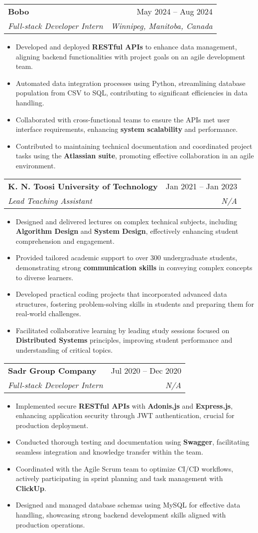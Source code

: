 \documentclass[letterpaper,11pt]{article}
\makeatletter
\newcommand{\resumeItem}[1]{
  \item\small{
    #1 \vspace{0pt}
  }
}
\newcommand{\resumeSubheading}[4]{
  \vspace{-2pt}\item
    \begin{tabular*}{0.97\textwidth}[t]{l@{\extracolsep{\fill}}r}
      \textbf{#1} & #2 \\
      \textit{\small#3} & \textit{\small #4} \\
    \end{tabular*}\vspace{-3pt}
}
\newcommand{\resumeItemListStart}{\begin{itemize}}
\newcommand{\resumeItemListEnd}{\end{itemize}\vspace{-5pt}}
\makeatother
\begin{document}
\resumeSubheading
    {Bobo}{May 2024 – Aug 2024}
    {Full-stack Developer Intern}{Winnipeg, Manitoba, Canada}
    \resumeItemListStart
        \resumeItem{Developed and deployed \textbf{RESTful APIs} to enhance data management, aligning backend functionalities with project goals on an agile development team.}
        \resumeItem{Automated data integration processes using Python, streamlining database population from CSV to SQL, contributing to significant efficiencies in data handling.}
        \resumeItem{Collaborated with cross-functional teams to ensure the APIs met user interface requirements, enhancing \textbf{system scalability} and performance.}
        \resumeItem{Contributed to maintaining technical documentation and coordinated project tasks using the \textbf{Atlassian suite}, promoting effective collaboration in an agile environment.}
    \resumeItemListEnd

\resumeSubheading
    {K. N. Toosi University of Technology}{Jan 2021 – Jan 2023}
    {Lead Teaching Assistant}{N/A}
    \resumeItemListStart
        \resumeItem{Designed and delivered lectures on complex technical subjects, including \textbf{Algorithm Design} and \textbf{System Design}, effectively enhancing student comprehension and engagement.}
        \resumeItem{Provided tailored academic support to over 300 undergraduate students, demonstrating strong \textbf{communication skills} in conveying complex concepts to diverse learners.}
        \resumeItem{Developed practical coding projects that incorporated advanced data structures, fostering problem-solving skills in students and preparing them for real-world challenges.}
        \resumeItem{Facilitated collaborative learning by leading study sessions focused on \textbf{Distributed Systems} principles, improving student performance and understanding of critical topics.}
    \resumeItemListEnd

\resumeSubheading
    {Sadr Group Company}{Jul 2020 – Dec 2020}
    {Full-stack Developer Intern}{N/A}
    \resumeItemListStart
        \resumeItem{Implemented secure \textbf{RESTful APIs} with \textbf{Adonis.js} and \textbf{Express.js}, enhancing application security through JWT authentication, crucial for production deployment.}
        \resumeItem{Conducted thorough testing and documentation using \textbf{Swagger}, facilitating seamless integration and knowledge transfer within the team.}
        \resumeItem{Coordinated with the Agile Scrum team to optimize CI/CD workflows, actively participating in sprint planning and task management with \textbf{ClickUp}.}
        \resumeItem{Designed and managed database schemas using MySQL for effective data handling, showcasing strong backend development skills aligned with production operations.}
    \resumeItemListEnd
\end{document}
